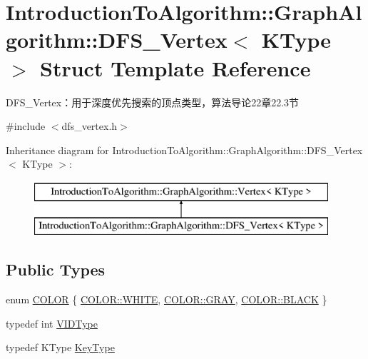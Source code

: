 \hypertarget{struct_introduction_to_algorithm_1_1_graph_algorithm_1_1_d_f_s___vertex}{}\section{Introduction\+To\+Algorithm\+:\+:Graph\+Algorithm\+:\+:D\+F\+S\+\_\+\+Vertex$<$ K\+Type $>$ Struct Template Reference}
\label{struct_introduction_to_algorithm_1_1_graph_algorithm_1_1_d_f_s___vertex}


D\+F\+S\+\_\+\+Vertex：用于深度优先搜索的顶点类型，算法导论22章22.3节  




{\ttfamily \#include $<$dfs\+\_\+vertex.\+h$>$}

Inheritance diagram for Introduction\+To\+Algorithm\+:\+:Graph\+Algorithm\+:\+:D\+F\+S\+\_\+\+Vertex$<$ K\+Type $>$\+:\begin{figure}[H]
\begin{center}
\leavevmode
\includegraphics[height=2.000000cm]{struct_introduction_to_algorithm_1_1_graph_algorithm_1_1_d_f_s___vertex}
\end{center}
\end{figure}
\subsection*{Public Types}
\begin{DoxyCompactItemize}
\item 
enum \hyperlink{struct_introduction_to_algorithm_1_1_graph_algorithm_1_1_d_f_s___vertex_a9455444fdfb1b29f24c1d27e74e7c124}{C\+O\+L\+O\+R} \{ \hyperlink{struct_introduction_to_algorithm_1_1_graph_algorithm_1_1_d_f_s___vertex_a9455444fdfb1b29f24c1d27e74e7c124ab5bf627e448384cf3a4c35121ca6008d}{C\+O\+L\+O\+R\+::\+W\+H\+I\+T\+E}, 
\hyperlink{struct_introduction_to_algorithm_1_1_graph_algorithm_1_1_d_f_s___vertex_a9455444fdfb1b29f24c1d27e74e7c124a48bf014c704c9eaae100a98006a37bf7}{C\+O\+L\+O\+R\+::\+G\+R\+A\+Y}, 
\hyperlink{struct_introduction_to_algorithm_1_1_graph_algorithm_1_1_d_f_s___vertex_a9455444fdfb1b29f24c1d27e74e7c124a08d0012388564e95c3b4a7407cf04965}{C\+O\+L\+O\+R\+::\+B\+L\+A\+C\+K}
 \}
\item 
typedef int \hyperlink{struct_introduction_to_algorithm_1_1_graph_algorithm_1_1_d_f_s___vertex_aeb115a10366eb62880d2672d4e1da7a1}{V\+I\+D\+Type}
\item 
typedef K\+Type \hyperlink{struct_introduction_to_algorithm_1_1_graph_algorithm_1_1_d_f_s___vertex_ab53cda3a7d135ed892b298c14d5579fe}{Key\+Type}
\end{DoxyCompactItemize}
